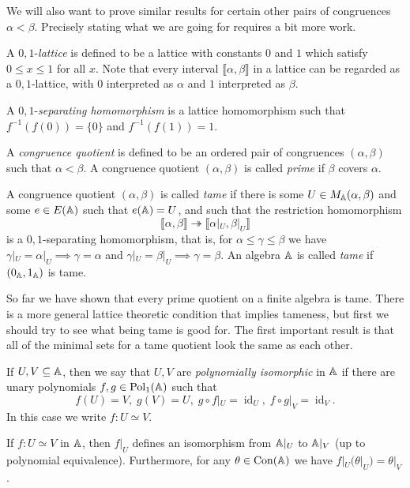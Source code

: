 \begin{appendices}
We will also want to prove similar results for certain other pairs of congruences $\alpha < \beta$. Precisely stating what we are going for requires a bit more work.

\begin{defn} A $0,1$-\emph{lattice} is defined to be a lattice with constants $0$ and $1$ which satisfy $0 \le x \le 1$ for all $x$. Note that every interval $\llbracket \alpha, \beta \rrbracket$ in a lattice can be regarded as a $0,1$-lattice, with $0$ interpreted as $\alpha$ and $1$ interpreted as $\beta$.

A $0,1$-\emph{separating homomorphism} is a lattice homomorphism such that $f^{-1}(f(0)) = \{0\}$ and $f^{-1}(f(1)) = 1$.
\end{defn}

\begin{defn} A \emph{congruence quotient} is defined to be an ordered pair of congruences $(\alpha,\beta)$ such that $\alpha < \beta$. A congruence quotient $(\alpha,\beta)$ is called \emph{prime} if $\beta$ covers $\alpha$.

A congruence quotient $(\alpha,\beta)$ is called \emph{tame} if there is some $U \in M_{\mathbb{A}}(\alpha,\beta)$ and some $e \in E(\mathbb{A})$ such that $e(\mathbb{A}) = U$, and such that the restriction homomorphism
\[
\llbracket \alpha, \beta \rrbracket \twoheadrightarrow \llbracket \alpha|_U, \beta|_U \rrbracket
\]
is a $0,1$-separating homomorphism, that is, for $\alpha \le \gamma \le \beta$ we have $\gamma|_U = \alpha|_U \implies \gamma = \alpha$ and $\gamma|_U = \beta|_U \implies \gamma = \beta$. An algebra $\mathbb{A}$ is called \emph{tame} if $(0_{\mathbb{A}},1_{\mathbb{A}})$ is tame.
\end{defn}

So far we have shown that every prime quotient on a finite algebra is tame. There is a more general lattice theoretic condition that implies tameness, but first we should try to see what being tame is good for. The first important result is that all of the minimal sets for a tame quotient look the same as each other.

\begin{defn} If $U,V \subseteq \mathbb{A}$, then we say that $U,V$ are \emph{polynomially isomorphic} in $\mathbb{A}$ if there are unary polynomials $f,g \in \operatorname{Pol}_1(\mathbb{A})$ such that
\[
f(U) = V, \; g(V) = U, \; g\circ f|_U = \operatorname{id}_U, \; f\circ g|_V = \operatorname{id}_V.
\]
In this case we write $f : U \simeq V$.
\end{defn}

\begin{prop} If $f : U \simeq V$ in $\mathbb{A}$, then $f|_U$ defines an isomorphism from $\mathbb{A}|_U$ to $\mathbb{A}|_V$ (up to polynomial equivalence). Furthermore, for any $\theta \in \operatorname{Con}(\mathbb{A})$ we have $f|_U(\theta|_U) = \theta|_V$.
\end{prop}


\end{appendices}
